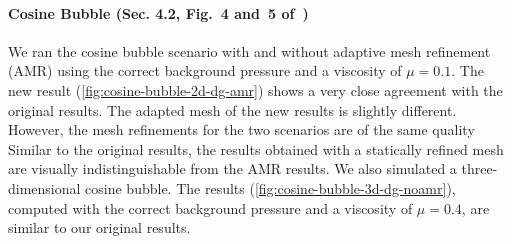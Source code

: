 \documentclass[runningheads]{llncs}
\begin{document}
\paragraph{Cosine Bubble (Sec. 4.2, Fig.~4 and~5 of~\cite{krenz2019high})}
We ran the cosine bubble scenario with and without adaptive mesh refinement (AMR) using the correct background pressure and a viscosity of $\mu=0.1$. 
The new result (\cref{fig:cosine-bubble-2d-dg-amr}) shows a very close agreement with the original results.
The adapted mesh of the new results is slightly different.
However, the mesh refinements for the two scenarios are of the same quality
Similar to the original results, the results obtained with a statically refined mesh are visually indistinguishable from the AMR results.
We also simulated a three-dimensional cosine bubble.
The results (\cref{fig:cosine-bubble-3d-dg-noamr}), computed with the correct background pressure and a viscosity of $\mu=0.4$, are similar to our original results.
\end{document}
